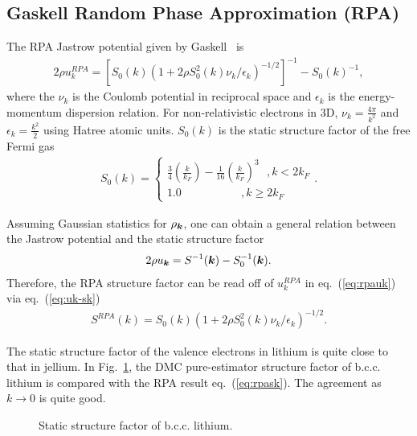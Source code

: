 \subsection{Gaskell Random Phase Approximation (RPA)}
The RPA Jastrow potential given by Gaskell~\cite{Gaskell1961, Ceperley1978, Holzmann2009, Holzmann2016} is
\begin{align}
2\rho u^{RPA}_k = \left[ S_0(k) \left( 1 + 2\rho S_0^2(k) \nu_k/\epsilon_k \right)^{-1/2} \right] ^{-1} - S_0(k)^{-1}, \label{eq:rpauk}
\end{align}
where the $\nu_k$ is the Coulomb potential in reciprocal space and $\epsilon_k$ is the energy-momentum dispersion relation. For non-relativistic electrons in 3D, $\nu_k=\frac{4\pi}{k^2}$ and $\epsilon_k=\frac{k^2}{2}$ using Hatree atomic units. $S_0(k)$ is the static structure factor of the free Fermi gas
\begin{align}
S_0(k) = \left\{\begin{array}{l}
\frac{3}{4}\left( \frac{k}{k_F} \right) - \frac{1}{16}\left(\frac{k}{k_F}\right)^3 ~~~, k<2k_F \\
1.0 ~~~~~~~~~~~~~~~~~~~~~~~~, k \geq 2k_F
\end{array}\right..
\end{align}

Assuming Gaussian statistics for $\rho_{\boldsymbol{k}}$, one can obtain a general relation between the Jastrow potential and the static structure factor~\cite{Holzmann2011} %
\begin{align}
2\rho u_{\boldsymbol{k}} = S^{-1}(\boldsymbol{k}) - S^{-1}_0(\boldsymbol{k}). \label{eq:uk-sk}
\end{align}
Therefore, the RPA structure factor can be read off of $u^{RPA}_k$ in eq.~(\ref{eq:rpauk}) via eq.~(\ref{eq:uk-sk})
\begin{align}
S^{RPA}(k) = S_0(k)\left( 1 + 2\rho S_0^2(k) \nu_k/\epsilon_k \right)^{-1/2}. \label{eq:rpask}
\end{align}

The static structure factor of the valence electrons in lithium is quite close to that in jellium. In Fig.~\ref{fig:rpask}, the DMC pure-estimator structure factor of b.c.c. lithium is compared with the RPA result eq.~(\ref{eq:rpask}). The agreement as $k\rightarrow0$ is quite good.

\begin{figure}[h]
\caption{Static structure factor of b.c.c. lithium.\label{fig:rpask}}
\end{figure}

